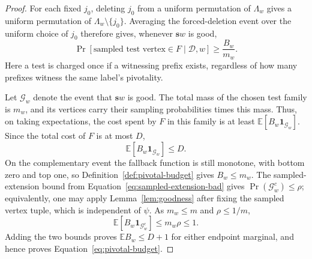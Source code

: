 \begin{proof}
For each fixed $j_0$, deleting $j_0$ from a uniform permutation of
$\Lambda_w$ gives a uniform permutation of
$\Lambda_w\setminus\{j_0\}$.  Averaging the forced-deletion event over
the uniform choice of $j_0$ therefore gives, whenever $\mathbf s w$ is
good,
\[
 \Pr[\text{sampled test vertex}\in F\mid\mathcal D,w]
 \ge \frac{B_w}{m_w}.
\]
Here a test is charged once if a witnessing prefix exists, regardless
of how many prefixes witness the same label's pivotality.

Let $\mathcal G_w$ denote the event that $\mathbf s w$ is good.
The total mass of the chosen test family is $m_w$, and its vertices
carry their sampling probabilities times this mass.  Thus, on taking
expectations, the cost spent by $F$ in this family is at least
$\mathbb E[B_w\mathbf 1_{\mathcal G_w}]$.  Since the total cost of
$F$ is at most $D$,
\[
 \mathbb E[B_w\mathbf 1_{\mathcal G_w}]\le D.
\]
On the complementary event the fallback function is still monotone,
with bottom zero and top one, so Definition~\ref{def:pivotal-budget}
gives $B_w\le m_w$.  The sampled-extension bound from
Equation~\eqref{eq:sampled-extension-bad} gives
$\Pr(\mathcal G_w^c)\le\rho$; equivalently, one may apply
Lemma~\ref{lem:goodness} after fixing the sampled vertex tuple, which
is independent of $\psi$.  As $m_w\le m$ and $\rho\le1/m$,
\[
 \mathbb E[B_w\mathbf 1_{\mathcal G_w^c}]
 \le m_w\rho\le1.
\]
Adding the two bounds proves $\mathbb E B_w\le D+1$ for either
endpoint marginal, and hence proves Equation~\eqref{eq:pivotal-budget}.
\end{proof}
